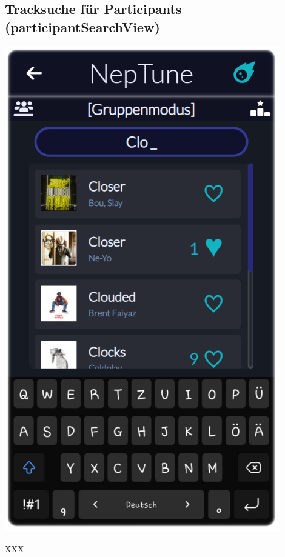 \documentclass[oneside, ngerman]{sdqtechreport}
\begin{document}
\subsection{Tracksuche für Participants (participantSearchView)}
\label{sec:Benutzeroberfläche:joinSessionView}


\begin{minipage}{0.5\textwidth}
    \hypertarget{participantSearchView}{}
    \includegraphics[width=0.9\textwidth]{LATEX/Pflichtenheft/GraphicDesigns/userSearchPage.png}
\end{minipage} 
\hfill
\begin{minipage}{0.5\textwidth}
    XXX
\end{minipage}
\end{document}
